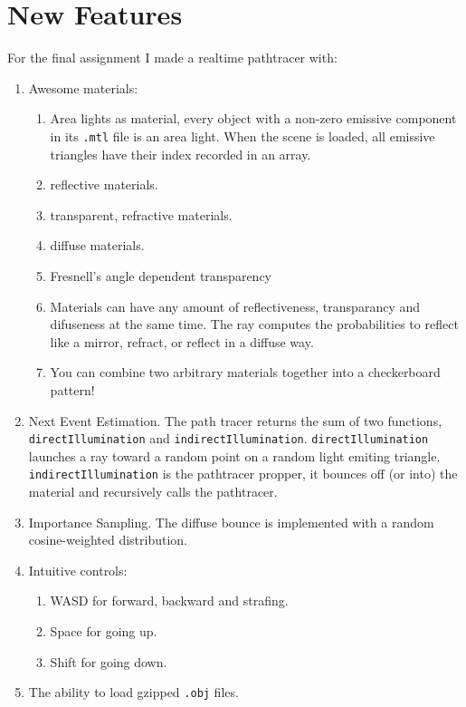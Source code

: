 \section{New Features}
For the final assignment I made a realtime pathtracer with:
\begin{enumerate}
    \item Awesome materials:
        \begin{enumerate}
            \item Area lights as material, every object with a non-zero emissive component in its \verb:.mtl: file is an area light.
                  When the scene is loaded, all emissive triangles have their index recorded in an array.
            \item reflective materials.
            \item transparent, refractive materials.
            \item diffuse materials.
            \item Fresnell's angle dependent transparency
            \item Materials can have any amount of reflectiveness, transparancy and difuseness at the same time.
                  The ray computes the probabilities to reflect like a mirror, refract, or reflect in a diffuse way.
            \item You can combine two arbitrary materials together into a checkerboard pattern!
        \end{enumerate}
    \item Next Event Estimation. 
        The path tracer returns the sum of two functions, \verb:directIllumination: and \verb:indirectIllumination:. 
        \verb:directIllumination: launches a ray toward a random point on a random light emiting triangle.
        \verb:indirectIllumination: is the pathtracer propper, it bounces off (or into) the material and recursively calls the pathtracer.
    \item Importance Sampling.
        The diffuse bounce is implemented with a random cosine-weighted distribution.
    \item Intuitive controls: 
        \begin{enumerate}
            \item WASD for forward, backward and strafing.
            \item Space for going up.
            \item Shift for going down.
        \end{enumerate}
    \item The ability to load gzipped \verb:.obj: files.

\end{enumerate}
